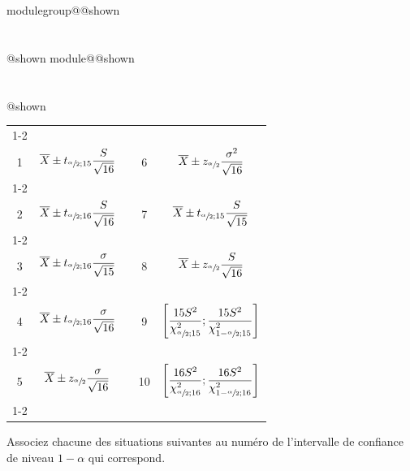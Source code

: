 \documentclass{Evaluation}
\makeatletter
\newcommand{\currentmodulekey}{}
\newcommand{\currentmoduletitle}{}
\newcommand{\currentgroupkey}{}
\newcommand{\currentgrouptitle}{}
\newcommand{\showmoduleifneeded}{%
  \ifx\currentgroupkey\empty\else
    \expandafter\ifx\csname modulegroup@\currentgroupkey @shown\endcsname\relax
      \section*{\currentgrouptitle}%
      \expandafter\gdef\csname modulegroup@\currentgroupkey @shown\endcsname{1}%
    \fi
  \fi
  \expandafter\ifx\csname module@\currentmodulekey @shown\endcsname\relax
    \section*{\currentmoduletitle}%
    \expandafter\gdef\csname module@\currentmodulekey @shown\endcsname{1}%
  \fi
}
\newenvironment{A23}{\showmoduleifneeded}{}
\makeatother
\begin{document}
\begin{questions}
\begin{A23}
\begin{center}
\begin{tabular}{|c|c|c|c|c|}
	\cline{1-2}\cline{4-5}
	&&&&\\[-3mm]
	1 &  $\displaystyle \overline {X}\pm t_{\sfrac{\alpha}{2};15}\frac{S}{\sqrt{16}}$
	 & \hspace{0.3cm} &
	 6 &  $\displaystyle \overline {X}\pm z_{\sfrac{\alpha}{2}}\frac{\sigma^2}{\sqrt{16}}$
	\\[4mm]
	\cline{1-2}\cline{4-5}
	&&&&\\[-3mm]
	 2 & $\displaystyle \overline {X}\pm t_{\sfrac{\alpha}{2};16}\frac{S}{\sqrt{16}}$
	&  &
	 7 & $\displaystyle \overline {X}\pm t_{\sfrac{\alpha}{2};15}\frac{S}{\sqrt{15}}$ 
	\\[4mm]
	\cline{1-2}\cline{4-5}
	&&&&\\[-3mm]
	 3 & $\displaystyle \overline {X}\pm t_{\sfrac{\alpha}{2};16}\frac{\sigma}{\sqrt{15}}$
	 &  &
	  8 & $\displaystyle \overline {X}\pm z_{\sfrac{\alpha}{2}}\frac{S}{\sqrt{16}}$
	 \\[4mm]
	 \cline{1-2}\cline{4-5}
	 &&&&\\[-3mm]
	   4 & $\displaystyle \overline {X}\pm t_{\sfrac{\alpha}{2};16}\frac{\sigma}{\sqrt{16}}$
	 &  &
	  9 & $\displaystyle \left[\frac{15S^2}{\chi_{\sfrac{\alpha}{2};15}^2};\frac{15S^2}{\chi_{1-\sfrac{\alpha}{2};15}^2}\right]$
	 \\[5mm]
	 \cline{1-2}\cline{4-5}
	 &&&&\\[-3mm]
	  5 & $\displaystyle \overline {X}\pm z_{\sfrac{\alpha}{2}}\frac{\sigma}{\sqrt{16}}$
	 &  &
	  10 & $\displaystyle \left[\frac{16S^2}{\chi_{\sfrac{\alpha}{2};16}^2};\frac{16S^2}{\chi_{1-\sfrac{\alpha}{2};16}^2}\right]$
	 \\[5mm]
	 \cline{1-2}\cline{4-5}

	
\end{tabular}

\end{center}

Associez chacune des situations suivantes au numéro de l'intervalle de confiance de niveau $1-\alpha$ qui correspond.


\end{A23}
\end{questions}
\end{document}
